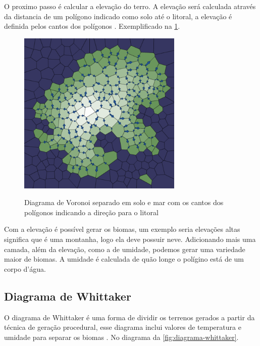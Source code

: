 O proximo passo é calcular a elevação do terro. A elevação será calculada através da distancia de um polígono indicado como solo até o litoral, a elevação é definida pelos cantos dos polígonos \cite{amitp2010}. Exemplificado na \cref{fig:downslopes}.

\begin{figure}[H]
	\caption{Diagrama de Voronoi separado em solo e mar com os cantos dos polígonos indicando a direção para o litoral}
	\centering
	\includegraphics[width=0.7\textwidth]{figures/downslopes.png}
	\label{fig:downslopes}
\end{figure}

Com a elevação é possível gerar os biomas, um exemplo seria elevações altas significa que é uma montanha, logo ela deve possuir neve. Adicionando mais uma camada, além da elevação, como a de umidade, podemos gerar uma variedade maior de biomas. A umidade é calculada de quão longe o polígino está de um corpo d'água.

\subsection*{Diagrama de Whittaker}

O diagrama de Whittaker é uma forma de dividir os terrenos gerados a partir da técnica de geração procedural, esse diagrama inclui valores de temperatura e umidade para separar os biomas \cite{wikidotwhittakerdiagram}. No diagrama da \cref{fig:diagrama-whittaker}.

